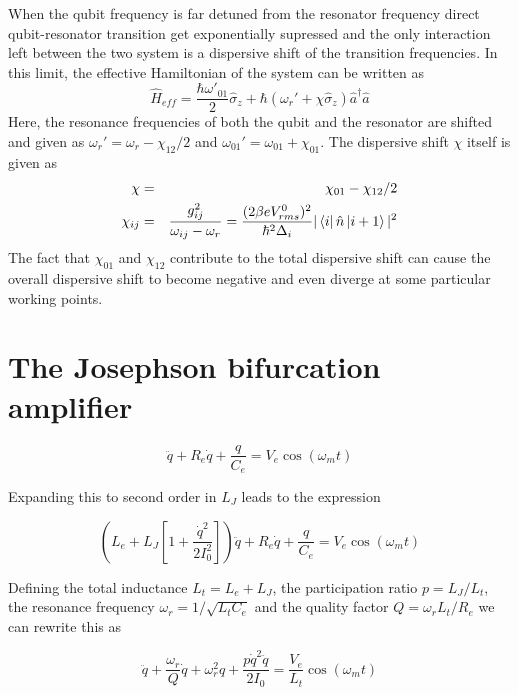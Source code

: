 When the qubit frequency is far detuned from the resonator frequency direct qubit-resonator transition get exponentially supressed and the only interaction left between the two system is a dispersive shift of the transition frequencies. In this limit, the effective Hamiltonian of the system can be written as\citep{blais_cavity_2004,koch_charge-insensitive_2007}
\begin{equation}
\hat{H}_{eff} = \frac{\hbar \omega'_{01}}{2}\hat{\sigma}_z+\hbar(\omega_r' +\chi \hat{\sigma}_z)\hat{a}^\dagger \hat{a}
\end{equation}
Here, the resonance frequencies of both the qubit and the resonator are shifted and given as $\omega_r' = \omega_r-\chi_{12}/2$ and $\omega_{01}' = \omega_{01}+\chi_{01}$. The dispersive shift $\chi$ itself is given as
\begin{eqnarray}
\chi & = & \chi_{01}-\chi_{12}/2 \\
\chi_{ij} & = & \frac{g_{ij}^2}{\omega_{ij}-\omega_r} = \frac{(2\beta e V_{rms}^0)^2}{\hbar^2 \Delta_i}|\left< i \right|\hat{n}\left| i+1 \right>|^2
\end{eqnarray}
The fact that $\chi_{01}$ and $\chi_{12}$ contribute to the total dispersive shift can cause the overall dispersive shift to become negative and even diverge at some particular working points.

\section{The Josephson bifurcation amplifier}

\citep{palacios-laloy_superconducting_2010}

\begin{equation}
[L_e+L_J (i)]\ddot{q}+R_e \dot{q}+\frac{q}{C_e} = V_e \cos{\left(\omega_m t\right)}
\end{equation}

Expanding this to second order in $L_J$ leads to the expression

\begin{equation}
\left(L_e+L_J\left[1+\frac{\dot{q}^2}{2 I_0^2}\right]\right)\ddot{q}+R_e \dot{q}+\frac{q}{C_e} = V_e \cos{\left( \omega_m t\right)}
\end{equation}

Defining the total inductance $L_t = L_e+L_J$, the participation ratio $p=L_J/L_t$, the resonance frequency $\omega_r = 1/\sqrt{L_t C_e}$ and the quality factor $Q = \omega_r L_t / R_e$ we can rewrite this as

\begin{equation}
\ddot{q}+\frac{\omega_r}{Q}\dot{q}+\omega_r^2 q + \frac{p \dot{q}^2 \ddot{q}}{2 I_0} = \frac{V_e}{L_t}\cos{\left(\omega_m t \right)}
\end{equation}

